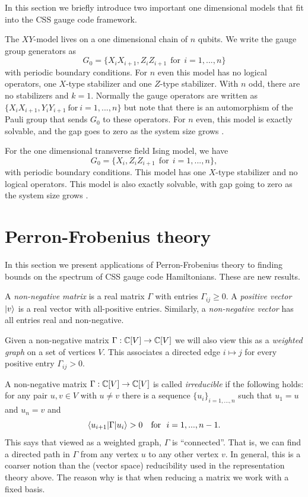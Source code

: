 In this section we briefly introduce two important
one dimensional models that fit into the CSS gauge code framework.

The $XY$-model \cite{Pfeuty1970}
lives on a one dimensional chain of $n$ qubits.
We write the gauge group generators as
$$
    G_0 = \{ X_i X_{i+1}, Z_i Z_{i+1}\ \ \mbox{for}\ \ i=1,...,n \}
$$
with periodic boundary conditions.
For $n$ even this model has no logical operators, one 
$X$-type stabilizer and one $Z$-type stabilizer.
With $n$ odd, there are no stabilizers and $k=1.$
Normally the gauge operators are written as 
$\{ X_i X_{i+1}, Y_i Y_{i+1} \ \mbox{for}\ i=1,...,n \}$
but note that there is an automorphism of the Pauli group
that sends $G_0$ to these operators.
For $n$ even, this model is exactly solvable,
and the gap goes to zero
as the system size grows \cite{Lieb1961}.

For the one dimensional transverse field
Ising model, we have 
$$
    G_0 = \{ X_i, Z_i Z_{i+1}\ \ \mbox{for}\ \ i=1,...,n \},
$$
with periodic boundary conditions.
This model has one 
$X$-type stabilizer and no logical operators.
This model is also exactly solvable, with gap going to zero
as the system size grows \cite{Pfeuty1970}.

\section{Perron-Frobenius theory}

In this section we present 
applications of Perron-Frobenius theory to finding bounds on the spectrum of
CSS gauge code Hamiltonians. These are new results.

A \emph{non-negative matrix} is a real matrix
$\Gamma$ with entries $\Gamma_{ij}\ge 0.$
A \emph{positive vector} $|{v}\rangle$ is a real vector 
with all-positive entries. Similarly, a \emph{non-negative vector}
has all entries real and non-negative.

Given a non-negative matrix 
$\Gamma : \mathbb{C}[V] \to \mathbb{C}[V]$
we will also view this as a \emph{weighted graph} on a set of vertices $V.$
This associates a directed edge $i\mapsto j$ for every positive
entry $\Gamma_{ij}>0.$

A non-negative matrix 
$\Gamma : \mathbb{C}[V] \to \mathbb{C}[V]$
is called \emph{irreducible} if the following holds:
for any pair $u, v\in V$ with $u\ne v$ there is
a sequence $\{u_i \}_{i=1,...,n}$ such that $u_1=u$
and $u_n=v$ and
$$
    \bra{u_{i+1}}\Gamma\ket{u_i} > 0\ \ \ \mbox{for}\ \ i=1,...,n-1.
$$
This says that viewed as a weighted graph, $\Gamma$ is ``connected''.
That is, we can find a directed path in $\Gamma$
from any vertex $u$ to any other vertex $v$.
In general, this is a coarser notion than
the (vector space) reducibility used in the representation theory above.
The reason why is that when reducing a matrix we work
with a fixed basis.

